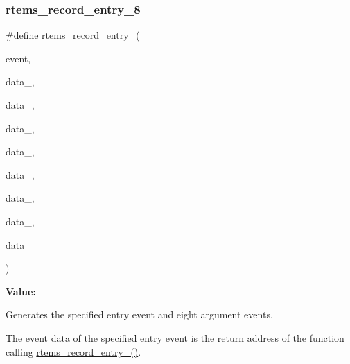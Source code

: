 \subsubsection{\texorpdfstring{rtems\_record\_entry\_8}{rtems\_record\_entry\_8}}
{\footnotesize\ttfamily \#define rtems\+\_\+record\+\_\+entry\+\_(\begin{DoxyParamCaption}\item[{}]{event,  }\item[{}]{data\+\_,  }\item[{}]{data\+\_,  }\item[{}]{data\+\_,  }\item[{}]{data\+\_,  }\item[{}]{data\+\_,  }\item[{}]{data\+\_,  }\item[{}]{data\+\_,  }\item[{}]{data\+\_ }\end{DoxyParamCaption})}

{\bfseries Value\+:}
\begin{DoxyCode}{0}
\DoxyCodeLine{  )}

\end{DoxyCode}


Generates the specified entry event and eight argument events. 

The event data of the specified entry event is the return address of the function calling \mbox{\hyperlink{group__RTEMSRecord_ga97d70c6f5b1f0bf6a489a6de00a4ab12}{rtems\+\_\+record\+\_\+entry\+\_()}}.


